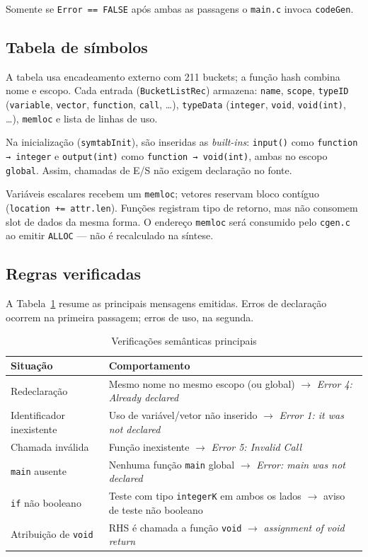 \documentclass[
	12pt,				%
	openright,			%
	a4paper,			%
	english,			%
	french,				%
	spanish,			%
	brazil,				%
	]{abntex2}
\begin{document}
Somente se \texttt{Error == FALSE} após ambas as passagens o \texttt{main.c} invoca \texttt{codeGen}.

\subsection{Tabela de símbolos}

A tabela usa encadeamento externo com 211 buckets; a função hash combina nome e escopo. Cada entrada (\texttt{BucketListRec}) armazena: \texttt{name}, \texttt{scope}, \texttt{typeID} (\texttt{variable}, \texttt{vector}, \texttt{function}, \texttt{call}, \ldots), \texttt{typeData} (\texttt{integer}, \texttt{void}, \texttt{void(int)}, \ldots), \texttt{memloc} e lista de linhas de uso.

Na inicialização (\texttt{symtabInit}), são inseridas as \emph{built-ins}:
\texttt{input()} como \texttt{function → integer} e \texttt{output(int)} como \texttt{function → void(int)}, ambas no escopo \texttt{global}. Assim, chamadas de E/S não exigem declaração no fonte.

Variáveis escalares recebem um \texttt{memloc}; vetores reservam bloco contíguo (\texttt{location += attr.len}). Funções registram tipo de retorno, mas não consomem slot de dados da mesma forma. O endereço \texttt{memloc} será consumido pelo \texttt{cgen.c} ao emitir \texttt{ALLOC} --- não é recalculado na síntese.

\subsection{Regras verificadas}

A Tabela~\ref{tab:erros-sem} resume as principais mensagens emitidas. Erros de declaração ocorrem na primeira passagem; erros de uso, na segunda.

\begin{table}[H]
\centering
\caption{Verificações semânticas principais}
\label{tab:erros-sem}
\small
\begin{tabular}{|p{3.2cm}|p{9cm}|}
\hline
\textbf{Situação} & \textbf{Comportamento} \\
\hline
Redeclaração & Mesmo nome no mesmo escopo (ou global) $\rightarrow$ \emph{Error 4: Already declared} \\
\hline
Identificador inexistente & Uso de variável/vetor não inserido $\rightarrow$ \emph{Error 1: it was not declared} \\
\hline
Chamada inválida & Função inexistente $\rightarrow$ \emph{Error 5: Invalid Call} \\
\hline
\texttt{main} ausente & Nenhuma função \texttt{main} global $\rightarrow$ \emph{Error: main was not declared} \\
\hline
\texttt{if} não booleano & Teste com tipo \texttt{integerK} em ambos os lados $\rightarrow$ aviso de teste não booleano \\
\hline
Atribuição de \texttt{void} & RHS é chamada a função \texttt{void} $\rightarrow$ \emph{assignment of void return} \\
\hline
\end{tabular}
\end{table}
\end{document}

